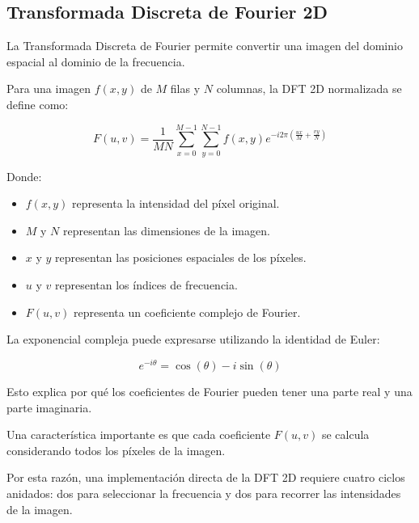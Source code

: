 \documentclass[11pt,letterpaper]{article}
\begin{document}
\subsection{Transformada Discreta de Fourier 2D}

La Transformada Discreta de Fourier permite convertir
una imagen del dominio espacial al dominio de la
frecuencia.

Para una imagen $f(x,y)$ de $M$ filas y $N$ columnas,
la DFT 2D normalizada se define como:

\begin{equation}
F(u,v)=
\frac{1}{MN}
\sum_{x=0}^{M-1}
\sum_{y=0}^{N-1}
f(x,y)
e^{-i2\pi\left(
\frac{ux}{M}+\frac{vy}{N}
\right)}
\label{eq:dft2}
\end{equation}

Donde:

\begin{itemize}

    \item $f(x,y)$ representa la intensidad del
    píxel original.

    \item $M$ y $N$ representan las dimensiones
    de la imagen.

    \item $x$ y $y$ representan las posiciones
    espaciales de los píxeles.

    \item $u$ y $v$ representan los índices
    de frecuencia.

    \item $F(u,v)$ representa un coeficiente
    complejo de Fourier.

\end{itemize}

La exponencial compleja puede expresarse utilizando
la identidad de Euler:

\begin{equation}
e^{-i\theta}=
\cos(\theta)-i\sin(\theta)
\end{equation}

Esto explica por qué los coeficientes de Fourier
pueden tener una parte real y una parte imaginaria.

Una característica importante es que cada coeficiente
$F(u,v)$ se calcula considerando todos los píxeles
de la imagen.

Por esta razón, una implementación directa de la DFT
2D requiere cuatro ciclos anidados: dos para seleccionar
la frecuencia y dos para recorrer las intensidades
de la imagen.
\end{document}
